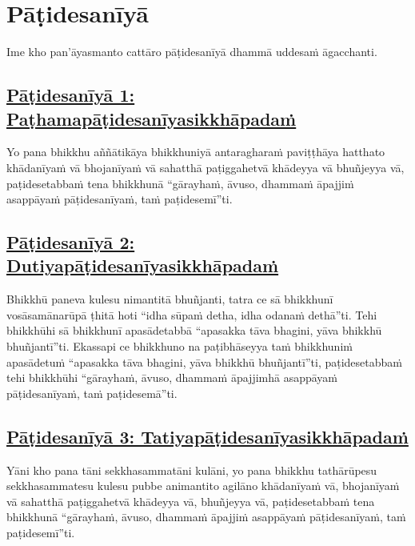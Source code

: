 \section{Pāṭidesanīyā}
\label{pd}

\begin{intro}
  Ime kho pan'āyasmanto cattāro pāṭidesanīyā dhammā uddesaṁ āgacchanti.
\end{intro}

\setsubsecheadstyle{\subsubsectionFmt}
\subsection*{\hyperref[ack1]{Pāṭidesanīyā 1: Paṭhamapāṭidesanīyasikkhāpadaṁ}}
\label{pd1}

Yo pana bhikkhu aññātikāya bhikkhuniyā antaragharaṁ paviṭṭhāya hatthato khādanīyaṁ vā bhojanīyaṁ vā sahatthā paṭiggahetvā khādeyya vā bhuñjeyya vā, paṭidesetabbaṁ tena bhikkhunā “gārayhaṁ, āvuso, dhammaṁ āpajjiṁ asappāyaṁ pāṭidesanīyaṁ, taṁ paṭidesemī”ti.

\subsection*{\hyperref[ack2]{Pāṭidesanīyā 2: Dutiyapāṭidesanīyasikkhāpadaṁ}}
\label{pd2}

Bhikkhū paneva kulesu nimantitā bhuñjanti, tatra ce sā bhikkhunī vosāsamānarūpā ṭhitā hoti “idha sūpaṁ detha, idha odanaṁ dethā”ti. Tehi bhikkhūhi sā bhikkhunī apasādetabbā “apasakka tāva bhagini, yāva bhikkhū bhuñjantī”ti. Ekassapi ce bhikkhuno na paṭibhāseyya taṁ bhikkhuniṁ apasādetuṁ “apasakka tāva bhagini, yāva bhikkhū bhuñjantī”ti, paṭidesetabbaṁ tehi bhikkhūhi “gārayhaṁ, āvuso, dhammaṁ āpajjimhā asappāyaṁ pāṭidesanīyaṁ, taṁ paṭidesemā”ti.

\subsection*{\hyperref[ack3]{Pāṭidesanīyā 3: Tatiyapāṭidesanīyasikkhāpadaṁ}}
\label{pd3}

Yāni kho pana tāni sekkhasammatāni kulāni, yo pana bhikkhu tathārūpesu sekkhasammatesu kulesu pubbe animantito agilāno khādanīyaṁ vā, bhojanīyaṁ vā sahatthā paṭiggahetvā khādeyya vā, bhuñjeyya vā, paṭidesetabbaṁ tena bhikkhunā “gārayhaṁ, āvuso, dhammaṁ āpajjiṁ asappāyaṁ pāṭidesanīyaṁ, taṁ paṭidesemī”ti.

